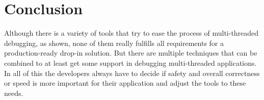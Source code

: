 \documentclass[english]{lni}
\begin{document}
\section{Conclusion}
\label{sct:conclusion}

Although there is a variety of tools that try to ease the process of multi-threaded debugging, as shown, none of them really fulfills all requirements for a production-ready drop-in solution.
But there are multiple techniques that can be combined to at least get some support in debugging multi-threaded applications.
In all of this the developers always have to decide if safety and overall correctness or speed is more important for their application and adjust the tools to these needs.

% 
\printbibliography
\end{document}
